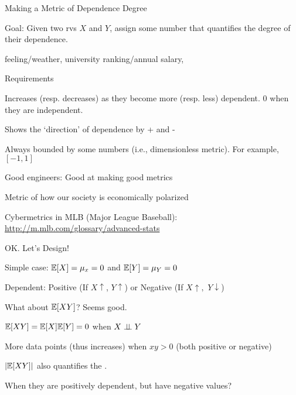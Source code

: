 \begin{frame}{Making a Metric of Dependence Degree}

\plitemsep 0.05in

\bci

\item<1-> Goal: Given two rvs $X$ and $Y$, assign some number that quantifies the degree of their dependence.
\bci
\item<2-> feeling/weather, university ranking/annual salary,
\eci


\item<3-> Requirements
\bce[\bf R1.]
\item<4-> Increases (resp. decreases) as they become more (resp. less) dependent. 0 when they are independent.
\item<5-> Shows the `direction' of dependence by + and -
\item<6-> Always bounded by some numbers (i.e., dimensionless metric). For example, $[-1,1]$
\ece

\item<7-> Good engineers: Good at making good metrics

\smallskip
\bci
\item Metric of how our society is economically polarized
\item Cybermetrics in MLB (Major League Baseball): \url{http://m.mlb.com/glossary/advanced-stats}
\eci

\eci

\end{frame}

\begin{frame}{OK. Let's Design!}

\plitemsep 0.04in

\bci

\item<1-> Simple case: $\mathbb{E}[ X ] =\mu_x = 0$ and $\mathbb{E}[ Y ]=\mu_Y = 0$
\item<2-> Dependent: Positive (If $X \uparrow$, $Y \uparrow$) or Negative (If $X \uparrow,$ $Y \downarrow$)

\item<3-> What about $\mathbb{E}[ XY ]$? Seems good.

\bci
\item<4-> $\mathbb{E}[ XY ] = \mathbb{E}[ X ]\mathbb{E}[ Y ]=0$ when $X \perp \!\!\! \perp Y$
\item<5-> More data points (thus increases) when $xy >0$ (both positive or negative)
\item<6-> $|\mathbb{E}[ XY ]|$ also quantifies the .
\eci

{
\vspace{-0.3cm}
}
{
\bigskip
{}
\bci
\item<7-> When they are positively dependent, but have negative values?
\eci
}

\eci

\end{frame}

